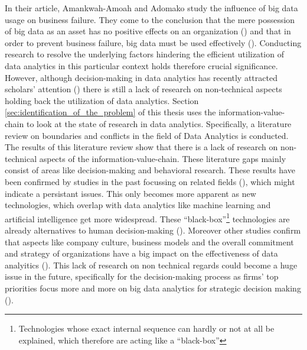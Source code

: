 In their article, Amankwah-Amoah and Adomako study the influence of big data usage on business failure. 
They come to the conclusion that the mere possession of big data as an asset has no positive effects on an organization (\cite{AmankwahAmoah.2019}) and that in order to prevent business failure, big data must be used effectively (\cite{AmankwahAmoah.2019}). Conducting research to resolve the underlying factors hindering the efficient utilization of data analytics in this particular context holds therefore crucial significance. However, although decision-making in data analytics has recently attracted scholars' attention (\cite{Chen.2022}) there is still a lack of research on non-technical aspects holding back the utilization of data analytics. Section \ref{sec:identification_of_the_problem} of this thesis uses the information-value-chain to look at the state of research in data analytics. Specifically, a literature review on boundaries and conflicts in the field of Data Analytics is conducted. The results of this literature review show that there is a lack of research on non-technical aspects of the information-value-chain. These literature gaps mainly consist of areas like decision-making and behavioral research. These results have been confirmed by studies in the past focussing on related fields (\cite{Trieu.2017}), which might indicate a persistant issues. This only becomes more apparent as new technologies, which overlap with data analytics like machine learning and artificial intelligence get more widespread. These \enquote{black-box}\footnote{Technologies whose exact internal sequence can hardly or not at all be explained, which therefore are acting like a \enquote{black-box}} technologies are already alternatives to human decision-making (\cite{Krakowski.2023}). Moreover other studies confirm that aspects like company culture, business models and the overall commitment and strategy of organizations have a big impact on the effectiveness of data analyitics (\cite{Holsapple.2014}). This lack of research on non technical regards could become a huge issue in the future, specifically for the decision-making process as firms' top priorities focus more and more on big data analytics for strategic decision making (\cite{Ghasemaghaei.2019}). 

